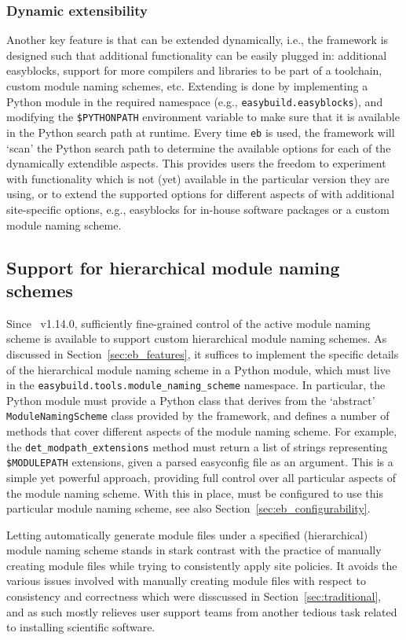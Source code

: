 \subsubsection{Dynamic extensibility}
\label{sec:eb_extensible}

Another key feature is that \easybuild{} can be extended dynamically, i.e., the
framework is designed such that additional functionality can be easily plugged in:
additional easyblocks, support for more compilers and libraries to be part
of a toolchain, custom module naming schemes, etc. Extending \easybuild{} is done by
implementing a Python module in the required namespace (e.g.,
\texttt{\small easybuild.easyblocks}), and modifying the \texttt{\small \$PYTHONPATH}
environment variable to make sure that it is available in the Python search path at
runtime. Every time \texttt{\small eb} is used, the framework will `scan' the Python 
search path to determine the available options for each of the dynamically 
extendible aspects. This provides \easybuild{} users the freedom to experiment with
functionality which is not (yet) available in the particular version they are using,
or to extend the supported options for different aspects of \easybuild{} with
additional site-specific options, e.g., easyblocks for in-house software packages or 
a custom module naming scheme.

\subsection{Support for hierarchical module naming schemes}
\label{sec:eb_hmns}

Since \easybuild{}~v1.14.0, sufficiently fine-grained control of the active module
naming scheme is available to support custom hierarchical
module naming schemes. As discussed in Section~\ref{sec:eb_features}, it suffices to
implement the specific details of the hierarchical module naming scheme in a Python
module, which must live in the \texttt{\small easybuild.tools.module\_naming\_scheme}
namespace. In particular, the Python module must provide a Python class that derives
from the `abstract' \texttt{\small ModuleNamingScheme} class provided by the
\easybuild{} framework, and defines a number of methods that cover different aspects
of the module naming scheme. For example, the
\texttt{\small det\_modpath\_extensions} method must return a list of strings
representing \texttt{\small \$MODULEPATH} extensions, given a
parsed easyconfig file as an argument. This is a simple yet powerful approach,
providing full control over all particular aspects of the module naming scheme.
With this in place, \easybuild{} must be configured to use this particular module
naming scheme, see also Section~\ref{sec:eb_configurability}.

Letting \easybuild{} automatically generate module files under a specified
(hierarchical) module naming scheme stands in stark contrast with the practice of
manually creating module files while trying to consistently apply site policies. It avoids the
various issues involved with manually creating module files with respect to consistency and
correctness which were disscussed in Section~\ref{sec:traditional}, and as such
mostly relieves user support teams from another tedious task related to installing
scientific software.
